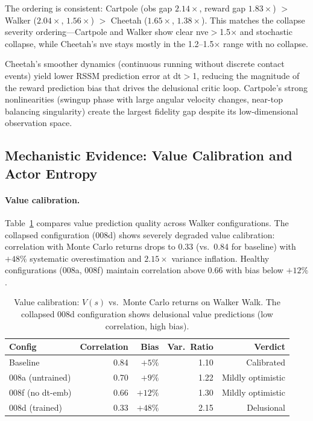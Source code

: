\documentclass[letterpaper]{article}
\begin{document}
The ordering is consistent: Cartpole (obs gap $2.14\times$, reward gap $1.83\times$) $>$ Walker ($2.04\times$, $1.56\times$) $>$ Cheetah ($1.65\times$, $1.38\times$).
This matches the collapse severity ordering---Cartpole and Walker show clear nve$>$1.5$\times$ and stochastic collapse, while Cheetah's nve stays mostly in the 1.2--1.5$\times$ range with no collapse.

Cheetah's smoother dynamics (continuous running without discrete contact events) yield lower RSSM prediction error at dt$>$1, reducing the magnitude of the reward prediction bias that drives the delusional critic loop.
Cartpole's strong nonlinearities (swingup phase with large angular velocity changes, near-top balancing singularity) create the largest fidelity gap despite its low-dimensional observation space.

\subsection{Mechanistic Evidence: Value Calibration and Actor Entropy}
\label{sec:mechanistic}

\paragraph{Value calibration.}
Table~\ref{tab:value_calibration} compares value prediction quality across Walker configurations.
The collapsed configuration (008d) shows severely degraded value calibration: correlation with Monte Carlo returns drops to 0.33 (vs.\ 0.84 for baseline) with $+48\%$ systematic overestimation and $2.15\times$ variance inflation.
Healthy configurations (008a, 008f) maintain correlation above 0.66 with bias below $+12\%$.

\begin{table}[t]
\centering
\caption{Value calibration: $V(s)$ vs.\ Monte Carlo returns on Walker Walk. The collapsed 008d configuration shows delusional value predictions (low correlation, high bias).}
\label{tab:value_calibration}
\small
\begin{tabular}{lrrrr}
\toprule
\textbf{Config} & \textbf{Correlation} & \textbf{Bias} & \textbf{Var.\ Ratio} & \textbf{Verdict} \\
\midrule
Baseline & 0.84 & $+5\%$ & 1.10 & Calibrated \\
008a (untrained) & 0.70 & $+9\%$ & 1.22 & Mildly optimistic \\
008f (no dt-emb) & 0.66 & $+12\%$ & 1.30 & Mildly optimistic \\
008d (trained) & 0.33 & $+48\%$ & 2.15 & Delusional \\
\bottomrule
\end{tabular}
\end{table}
\end{document}
